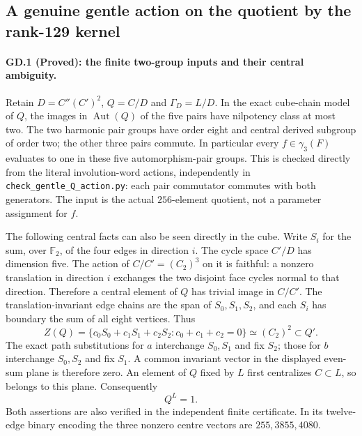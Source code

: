 \subsection*{A genuine gentle action on the quotient by the rank-129 kernel}

\paragraph{GD.1 (Proved): the finite two-group inputs and their central ambiguity.}
Retain $D=C''(C')^2$, $Q=C/D$ and $\Gamma_D=L/D$.
In the exact cube-chain model of $Q$, the images in
$\operatorname{Aut}(Q)$ of the five pairs have nilpotency
class at most two. The two harmonic pair groups have
order eight and central derived subgroup of order two;
the other three pairs commute. In particular every
$f\in\gamma_3(F)$ evaluates to one in these five
automorphism-pair groups. This is checked directly
from the literal involution-word actions, independently
in \texttt{check\_gentle\_Q\_action.py}: each pair
commutator commutes with both generators. The input
is the actual $256$-element quotient, not a parameter
assignment for $f$.

The following central facts can also be seen directly
in the cube. Write $S_i$ for the sum, over $\mathbb F_2$,
of the four edges in direction $i$. The cycle space
$C'/D$ has dimension five. The action of
$C/C'=(C_2)^3$ on it is faithful: a nonzero translation
in direction $i$ exchanges the two disjoint face
cycles normal to that direction. Therefore a central
element of $Q$ has trivial image in $C/C'$. The
translation-invariant edge chains are the span of
$S_0,S_1,S_2$, and each $S_i$ has boundary the sum
of all eight vertices. Thus
\[
 Z(Q)=\{c_0S_0+c_1S_1+c_2S_2:c_0+c_1+c_2=0\}
           \simeq(C_2)^2\subset Q'.
 \tag{GD.1a}
\]
The exact path substitutions for $a$ interchange
$S_0,S_1$ and fix $S_2$; those for $b$ interchange
$S_0,S_2$ and fix $S_1$. A common invariant vector
in the displayed even-sum plane is therefore zero.
An element of $Q$ fixed by $L$ first centralizes
$C\subset L$, so belongs to this plane. Consequently
\[
                              Q^L=1.
 \tag{GD.1b}
\]
Both assertions are also verified in the independent
finite certificate. In its twelve-edge binary
encoding the three nonzero centre vectors are
$255,3855,4080$.

